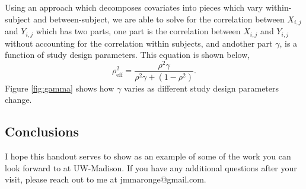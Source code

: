\documentclass[12pt]{article}
\begin{document}
\begin{multicols}{2}
Using an approach which decomposes covariates into pieces which vary within-subject and between-subject, we are able to solve for the correlation between $X_{i,j}$ and $Y_{i,j}$ which has two parts, one part is the correlation between $X_{i,j}$ and $Y_{i,j}$ without accounting for the correlation within subjects, and andother part $\gamma$, is a function of study design parameters. This equation is shown below, 
\begin{equation} \label{eq:rhoeff}
\rho^2_{\mbox{eff}} =\frac{\rho^2\gamma}{\rho^2\gamma+(1-\rho^2)}.
\end{equation}
\noindent Figure \ref{fig:gamma} shows how $\gamma$ varies as different study design parameters change.

\subsection*{Conclusions}
I hope this handout serves to show as an example of some of the work you can look forward to at UW-Madison. If you have any additional questions after your visit, please reach out to me at jmmaronge@gmail.com.
\end{multicols}
\end{document}
